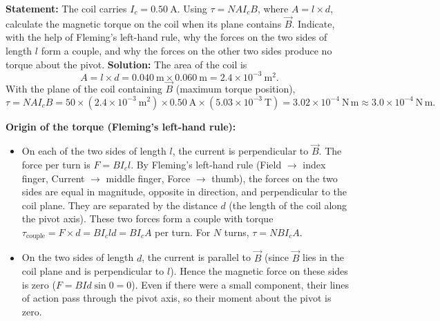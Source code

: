 \documentclass[11pt]{article}
\newcommand{\cle}[1]{{\popxbold\color{popdark}#1}}
\begin{document}
\begin{exoresolu}
\textbf{Statement:} The coil carries $I_c = 0.50\ \mathrm{A}$. Using $\tau = N A I_c B$, where $A = l \times d$, calculate the magnetic torque on the coil when its plane contains $\vec{B}$. Indicate, with the help of Fleming's left-hand rule, why the forces on the two sides of length $l$ form a couple, and why the forces on the other two sides produce no torque about the pivot.
\tcblower
\textbf{Solution:}
The area of the coil is
\[
A = l \times d = 0.040\ \mathrm{m} \times 0.060\ \mathrm{m} = 2.4 \times 10^{-3}\ \mathrm{m^2}.
\]
With the plane of the coil containing $\vec{B}$ (maximum torque position),
\[
\tau = N A I_c B = 50 \times (2.4 \times 10^{-3}\ \mathrm{m^2}) \times 0.50\ \mathrm{A} \times (5.03 \times 10^{-3}\ \mathrm{T})
= 3.02 \times 10^{-4}\ \mathrm{N\,m} \approx 3.0 \times 10^{-4}\ \mathrm{N\,m}.
\]

\textbf{Origin of the torque (Fleming's left-hand rule):}
\begin{itemize}
\item On each of the two sides of length $l$, the current is perpendicular to $\vec{B}$. The force per turn is $F = B I_c l$. By Fleming's left-hand rule (Field $\to$ index finger, Current $\to$ middle finger, Force $\to$ thumb), the forces on the two sides are equal in magnitude, opposite in direction, and perpendicular to the coil plane. They are separated by the distance $d$ (the length of the coil along the pivot axis). These two forces form a \cle{couple} with torque $\tau_{\text{couple}} = F \times d = B I_c l d = B I_c A$ per turn. For $N$ turns, $\tau = N B I_c A$.
\item On the two sides of length $d$, the current is parallel to $\vec{B}$ (since $\vec{B}$ lies in the coil plane and is perpendicular to $l$). Hence the magnetic force on these sides is zero ($F = B I d \sin 0 = 0$). Even if there were a small component, their lines of action pass through the pivot axis, so their moment about the pivot is zero.
\end{itemize}
\end{exoresolu}
\end{document}
